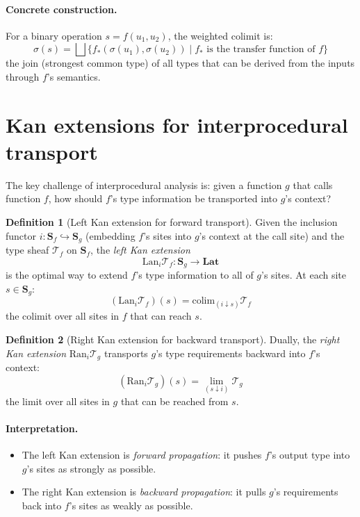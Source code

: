 \documentclass[11pt]{report}
\theoremstyle{definition}
\newtheorem{definition}{Definition}[section]
\theoremstyle{plain}
\begin{document}
\paragraph{Concrete construction.}
For a binary operation $s = f(u_1, u_2)$, the weighted colimit is:
\[
  \sigma(s) = \bigsqcup \{f_*(\sigma(u_1), \sigma(u_2)) \mid
    f_* \text{ is the transfer function of } f\}
\]
the join (strongest common type) of all types that can be derived from the
inputs through $f$'s semantics.

\section{Kan extensions for interprocedural transport}

The key challenge of interprocedural analysis is: given a function $g$ that
calls function $f$, how should $f$'s type information be transported into
$g$'s context?

\begin{definition}[Left Kan extension for forward transport]
Given the inclusion functor $i : \mathbf{S}_f \hookrightarrow \mathbf{S}_g$
(embedding $f$'s sites into $g$'s context at the call site) and the type
sheaf $\mathcal{T}_f$ on $\mathbf{S}_f$, the \emph{left Kan extension}
\[
  \mathrm{Lan}_i \mathcal{T}_f : \mathbf{S}_g \to \mathbf{Lat}
\]
is the optimal way to extend $f$'s type information to all of $g$'s sites.
At each site $s \in \mathbf{S}_g$:
\[
  (\mathrm{Lan}_i \mathcal{T}_f)(s) = \mathrm{colim}_{(i \downarrow s)}
    \mathcal{T}_f
\]
the colimit over all sites in $f$ that can reach $s$.
\end{definition}

\begin{definition}[Right Kan extension for backward transport]
Dually, the \emph{right Kan extension}
$\mathrm{Ran}_i \mathcal{T}_g$ transports $g$'s type requirements backward
into $f$'s context:
\[
  (\mathrm{Ran}_i \mathcal{T}_g)(s) = \lim_{(s \downarrow i)}
    \mathcal{T}_g
\]
the limit over all sites in $g$ that can be reached from $s$.
\end{definition}

\paragraph{Interpretation.}
\begin{itemize}[nosep]
  \item The left Kan extension is \emph{forward propagation}: it pushes
        $f$'s output type into $g$'s sites as strongly as possible.
  \item The right Kan extension is \emph{backward propagation}: it pulls
        $g$'s requirements back into $f$'s sites as weakly as possible.
\end{itemize}
\end{document}
